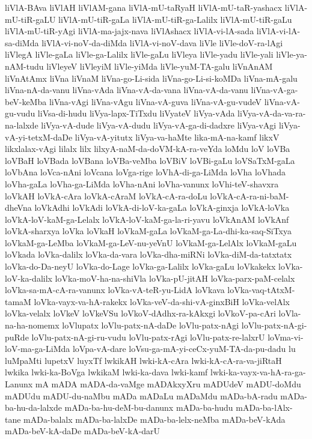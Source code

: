 {liVlA-BAva
liVlAH
liVlAM-gana
liVlA-mU-taRyaH
liVlA-mU-taR-yashacx
liVlA-mU-tiR-gaLU
liVlA-mU-tiR-gaLa
liVlA-mU-tiR-ga-Lalilx
liVlA-mU-tiR-gaLu
liVlA-mU-tiR-yAgi
liVlA-ma-jajx-nava
liVlAshacx
liVlA-vi-lA-sada
liVlA-vi-lA-sa-diMda
liVlA-vi-noV-da-diMda
liVlA-vi-noV-dava
liVle
liVle-doV-ra-lAgi
liVlegA
liVle-gaLa
liVle-ga-Lalilx
liVle-gaLu
liVleya
liVle-yadu
liVle-yali
liVle-ya-nAM-tudu
liVleyeV
liVleyiM
liVle-yiMda
liVle-yuM-TA-galu
liVnAnAM
liVnAtAmx
liVna
liVnaM
liVna-go-Li-sida
liVna-go-Li-si-koMDa
liVna-mA-galu
liVna-nA-da-vanu
liVna-vAda
liVna-vA-da-vana
liVna-vA-da-vanu
liVna-vA-ga-beV-keMba
liVna-vAgi
liVna-vAgu
liVna-vA-guva
liVna-vA-gu-vudeV
liVna-vA-gu-vudu
liVsa-di-hudu
liVya-lapx-TiTxdu
liVyateV
liVya-vAda
liVya-vA-da-va-ra-na-lalxde
liVya-vA-dude
liVya-vA-dudu
liVya-vA-ga-di-dadxre
liVya-vAgi
liVya-vA-yi-tetxM-daDe
liVya-vA-yitutx
liVya-va-haMte
lika-mA-na-kamf
likxV
likxlalax-vAgi
lilalx
lilx
lilxyA-naM-da-doVM-kA-ra-veYda
loMdu
loV
loVBa
loVBaH
loVBada
loVBana
loVBa-veMba
loVBiV
loVBi-gaLu
loVSaTxM-gaLa
loVbAna
loVca-nAni
loVcana
loVga-rige
loVhA-di-ga-LiMda
loVha
loVhada
loVha-gaLa
loVha-ga-LiMda
loVha-nAni
loVha-vanunx
loVhi-teV-shavxra
loVkAH
loVkA-cAra
loVkA-cAraM
loVkA-cA-ra-doLu
loVkA-cA-ra-ni-baM-dheVna
loVkAdhi
loVkAdi
loVkA-di-loV-ka-gaLa
loVkA-ginxja
loVkA-loVka
loVkA-loV-kaM-ga-Lelalx
loVkA-loV-kaM-ga-la-ri-yavu
loVkAnAM
loVkAnf
loVkA-sharxya
loVka
loVkaH
loVkaM-gaLa
loVkaM-ga-La-dhi-ka-saq-SiTxya
loVkaM-ga-LeMba
loVkaM-ga-LeV-nu-yeVnU
loVkaM-ga-LelAlx
loVkaM-gaLu
loVkada
loVka-dalilx
loVka-da-vara
loVka-dha-miRNi
loVka-diM-da-tatxtatx
loVka-do-Da-neyU
loVka-do-Lage
loVka-ga-Lalilx
loVka-gaLu
loVkakekx
loVka-loV-ka-dalilx
loVka-moV-ha-na-shiVla
loVka-pU-jitAH
loVka-parx-paM-celalx
loVka-sa-mA-cA-ra-vanunx
loVka-vA-teR-yu-LidA
loVkava
loVka-vaq-tAtxM-tamaM
loVka-vayx-va-hA-rakekx
loVka-veV-da-shi-vA-ginxBiH
loVka-velAlx
loVka-velalx
loVkeV
loVkeVSu
loVkoV-dAdhx-ra-kAkxgi
loVkoV-pa-cAri
loVla-na-ha-nomemx
loVlupatx
loVlu-patx-nA-daDe
loVlu-patx-nAgi
loVlu-patx-nA-gi-puRde
loVlu-patx-nA-gi-ru-vudu
loVlu-patx-rAgi
loVlu-patx-re-lalxrU
loVma-vi-loV-ma-ga-LiMda
loVpa-vA-dare
loVsu-ga-mA-yi-ceCx-yuM-TA-da-pu-dadu
lu
luMpaMti
lupetxV
luyxTf
lwkikAH
lwki-kA-cAra
lwki-kA-cA-ra-va-jiRtaH
lwkika
lwki-ka-BoVga
lwkikaM
lwki-ka-dava
lwki-kamf
lwki-ka-vayx-va-hA-ra-ga-Lanunx
mA
mADA
mADA-da-vaMge
mADAkxyXru
mADUdeV
mADU-doMdu
mADUdu
mADU-du-naMbu
mADa
mADaLu
mADaMdu
mADa-bA-radu
mADa-ba-hu-da-lalxde
mADa-ba-hu-deM-bu-danunx
mADa-ba-hudu
mADa-ba-lAlx-tane
mADa-balalx
mADa-ba-lalxDe
mADa-ba-lelx-neMba
mADa-beV-kAda
mADa-beV-kA-daDe
mADa-beV-kA-darU
}

